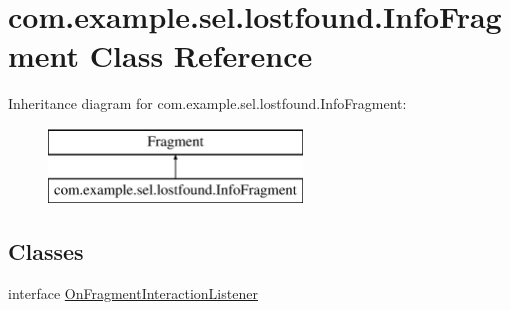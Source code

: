 \hypertarget{classcom_1_1example_1_1sel_1_1lostfound_1_1InfoFragment}{\section{com.\-example.\-sel.\-lostfound.\-Info\-Fragment Class Reference}
\label{classcom_1_1example_1_1sel_1_1lostfound_1_1InfoFragment}
}
Inheritance diagram for com.\-example.\-sel.\-lostfound.\-Info\-Fragment\-:\begin{figure}[H]
\begin{center}
\leavevmode
\includegraphics[height=2.000000cm]{classcom_1_1example_1_1sel_1_1lostfound_1_1InfoFragment}
\end{center}
\end{figure}
\subsection*{Classes}
\begin{DoxyCompactItemize}
\item 
interface \hyperlink{interfacecom_1_1example_1_1sel_1_1lostfound_1_1InfoFragment_1_1OnFragmentInteractionListener}{On\-Fragment\-Interaction\-Listener}
\end{DoxyCompactItemize}
